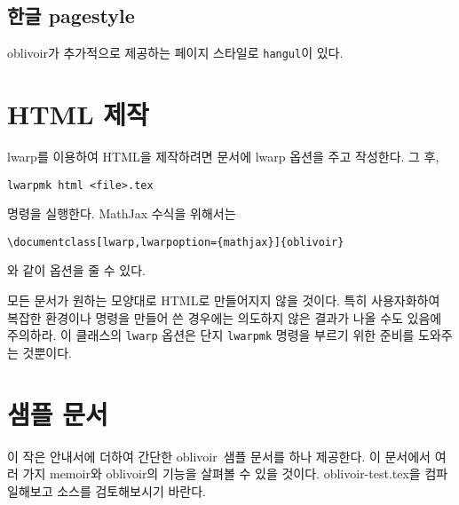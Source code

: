\documentclass[
	12pt,
	a4paper,
	kosection,
	footnote,
	nobookmarks,
	microtype,
]{oblivoir}
\newcommand\obclass{ob\-liv\-oir\oblivoirallowbreak}
\begin{document}
\subsection{한글 pagestyle}

oblivoir가 추가적으로 제공하는 페이지 스타일로 \texttt{hangul}이 있다.
\begin{boxedverbatim}
\pagestyle{hangul}
\end{boxedverbatim}

\section{HTML 제작}

\textsf{lwarp}를 이용하여 HTML을 제작하려면 문서에 \textsf{lwarp} 
옵션을 주고 작성한다. 그 후,
\begin{verbatim}
lwarpmk html <file>.tex
\end{verbatim}
명령을 실행한다. MathJax 수식을 위해서는 
\begin{verbatim}
\documentclass[lwarp,lwarpoption={mathjax}]{oblivoir}
\end{verbatim}
와 같이 옵션을 줄 수 있다.

모든 문서가 원하는 모양대로 HTML로 만들어지지 않을 것이다. 특히
사용자화하여 복잡한 환경이나 명령을 만들어 쓴 경우에는 의도하지 않은
결과가 나올 수도 있음에 주의하라. 이 클래스의 \verb|lwarp| 옵션은
단지 \verb|lwarpmk| 명령을 부르기 위한 준비를 도와주는 것뿐이다.

\section{샘플 문서}

이 작은 안내서에 더하여 간단한 \obclass\ 샘플 문서를 하나 제공한다.
이 문서에서 여러 가지 memoir와 \obclass 의 기능을 살펴볼 수 있을 것이다.
oblivoir-test.tex을 컴파일해보고 소스를 검토해보시기 바란다.
\end{document}
